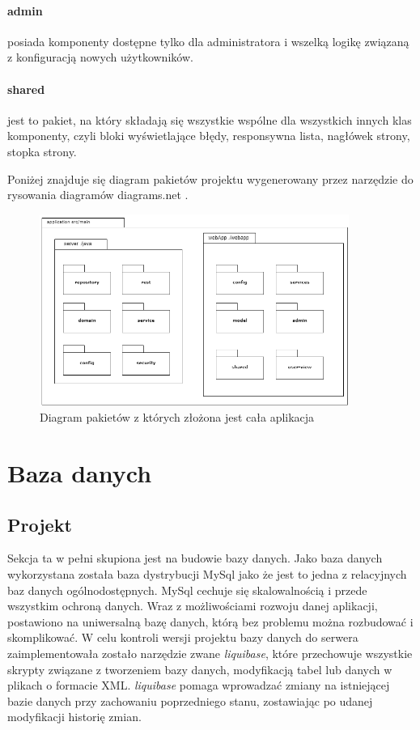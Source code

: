 \paragraph{admin} posiada komponenty dostępne tylko dla administratora i wszelką logikę związaną z konfiguracją nowych użytkowników.
\paragraph{shared} jest to pakiet, na który składają się wszystkie wspólne dla wszystkich innych klas komponenty, czyli bloki wyświetlające błędy, responsywna lista, nagłówek strony, stopka strony. 
\newline


Poniżej znajduje się diagram pakietów projektu wygenerowany przez narzędzie do rysowania diagramów diagrams.net \cite{diagrams}.
\begin{figure}[h]
	
	\centering
	\includegraphics[width=0.90\textwidth]{pakiety}		
	\caption{Diagram pakietów z których złożona jest cała aplikacja }
	\label{pakiet}
\end{figure}


\section{Baza danych}

\subsection{Projekt}
Sekcja ta w pełni skupiona jest na budowie bazy danych. Jako baza danych wykorzystana została baza dystrybucji MySql jako że jest to jedna z relacyjnych baz danych ogólnodostępnych. MySql cechuje się skalowalnością i przede wszystkim ochroną danych. Wraz z możliwościami rozwoju danej aplikacji, postawiono na uniwersalną bazę danych, którą bez problemu można rozbudować i skomplikować.
W celu kontroli wersji projektu bazy danych do serwera zaimplementowała zostało narzędzie zwane \textit{liquibase}, które przechowuje wszystkie skrypty związane z tworzeniem bazy danych, modyfikacją tabel lub danych w plikach o formacie XML. \textit{liquibase} pomaga wprowadzać zmiany na istniejącej bazie danych przy zachowaniu poprzedniego stanu, zostawiając po udanej modyfikacji historię zmian. 


